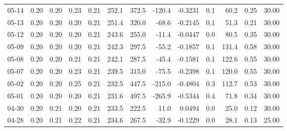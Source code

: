\begin{threeparttable}
{\begin{tabular}{lrrrrrrrrrrrr}
  05-14 &          0.20 &          0.20 &          0.23 &        0.21 &               252.1 &               372.5 &     -120.4 &      -0.3231 &                 0.1 &             60.2 &            0.25 &                  30.00 \\
  05-13 &          0.20 &          0.20 &          0.20 &        0.21 &               251.4 &               320.0 &      -68.6 &      -0.2145 &                 0.1 &             51.3 &            0.21 &                  30.00 \\
  05-12 &          0.20 &          0.20 &          0.20 &        0.21 &               243.6 &               255.0 &      -11.4 &      -0.0447 &                 0.0 &             80.5 &            0.35 &                  30.00 \\
  05-09 &          0.20 &          0.20 &          0.20 &        0.21 &               242.3 &               297.5 &      -55.2 &      -0.1857 &                 0.1 &            131.4 &            0.58 &                  30.00 \\
  05-08 &          0.20 &          0.20 &          0.21 &        0.21 &               242.1 &               287.5 &      -45.4 &      -0.1581 &                 0.1 &            122.6 &            0.55 &                  30.00 \\
  05-07 &          0.20 &          0.20 &          0.23 &        0.21 &               239.5 &               315.0 &      -75.5 &      -0.2398 &                 0.1 &            120.0 &            0.55 &                  30.00 \\
  05-02 &          0.20 &          0.20 &          0.25 &        0.21 &               232.5 &               447.5 &     -215.0 &      -0.4804 &                 0.3 &            112.7 &            0.53 &                  30.00 \\
  05-01 &          0.20 &          0.20 &          0.20 &        0.21 &               231.6 &               497.5 &     -265.9 &      -0.5344 &                 0.4 &             71.8 &            0.34 &                  30.00 \\
  04-30 &          0.20 &          0.21 &          0.20 &        0.21 &               233.5 &               222.5 &       11.0 &       0.0494 &                 0.0 &             25.0 &            0.12 &                  30.00 \\
  04-28 &          0.20 &          0.21 &          0.22 &        0.21 &               234.6 &               267.5 &      -32.9 &      -0.1229 &                 0.0 &             28.1 &            0.13 &                  25.00 \\

\end{tabular}}
\end{threeparttable}
